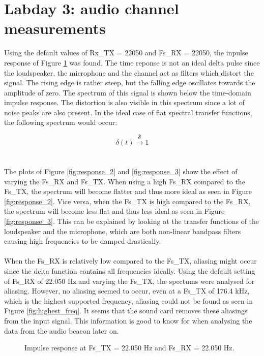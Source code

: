 \documentclass[final]{scrreprt} %
\begin{document}
\section{Labday 3: audio channel measurements}
Using the default values of Rx\_TX = 22050 and Fs\_RX = 22050, the inpulse response of Figure \ref{fig:response_1} was found.
The time reponse is not an ideal delta pulse since the loudspeaker, the microphone and the channel act as filters which distort the signal.
The rising edge is rather steep, but the falling edge oscillates towards the amplitude of zero.
The spectrum of this signal is shown below the time-domain impulse response.
The distortion is also visible in this spectrum since a lot of noise peaks are also present.
In the ideal case of flat spectral transfer functions, the following spectrum would occur:

\begin{equation}
	\delta(t) \xrightarrow{\mathfrak{F}} 1
\end{equation}
\\ \\
The plots of Figure \ref{fig:response_2} and \ref{fig:response_3} show the effect of varying the Fs\_RX and Fs\_TX.
When using a high Fs\_RX compared to the Fs\_TX, the spectrum will become flatter and thus more ideal as seen in Figure \ref{fig:response_2}.
Vice versa, when the Fs\_TX is high compared to the Fs\_RX, the spectrum will become less flat and thus less ideal as seen in Figure \ref{fig:response_3}.
This can be explained by looking at the transfer functions of the loudspeaker and the microphone, which are both non-linear bandpass filters causing high frequencies to be damped drastically.
\\ \\
When the Fs\_RX is relatively low compared to the Fs\_TX, aliasing might occur since the delta function contains all frequencies ideally.
Using the default setting of Fs\_RX of 22.050 Hz and varying the Fs\_TX, the spectums were analysed for aliasing.
However, no aliasing seemed to occur, even at a Fs\_TX of 176.4 kHz, which is the highest supported frequency, aliasing could not be found as seen in Figure \ref{fig:highest_freq}.
It seems that the sound card removes these aliasings from the input signal.
This information is good to know for when analysing the data from the audio beacon later on.

\begin{figure}[H]
	\centering
	\setlength\figureheight{4cm}
    	\setlength{}
	
	\caption{Impulse response at Fs\_TX = 22.050 Hz and Fs\_RX = 22.050 Hz.}
	\label{fig:response_1}
\end{figure}
\end{document}
